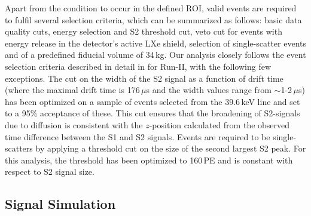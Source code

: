 Apart from the condition to occur in the defined ROI, valid events are required to fulfil several selection criteria, 
which can be summarized as follows: basic data quality cuts, energy selection and S2 threshold cut, veto cut for events with energy release in the detector's 
active LXe shield, selection of single-scatter events and of a predefined fiducial volume of 34\,kg.  
Our analysis closely follows the event selection criteria described in detail in \cite{Aprile:2012vw} for Run-II, with the following few exceptions. 
The cut on the width of the S2 signal as a function of drift time (where the maximal drift time is 176\,$\mu$s and the width values range from $\sim$1-2\,$\mu$s) has been optimized on a sample of events selected from the 39.6\,keV line and set to a 95\% acceptance of these. This cut ensures that the broadening of S2-signals due to diffusion is consistent with the $z$-position calculated from the observed time difference between the S1 and S2 signals. Events are required to be single-scatters by applying a threshold cut on the size of the 
second largest S2 peak. For this analysis, the threshold has been optimized to 160\,PE and is constant with respect to S2 signal size. 


\subsection{Signal Simulation} 
\label{sec:signal}

